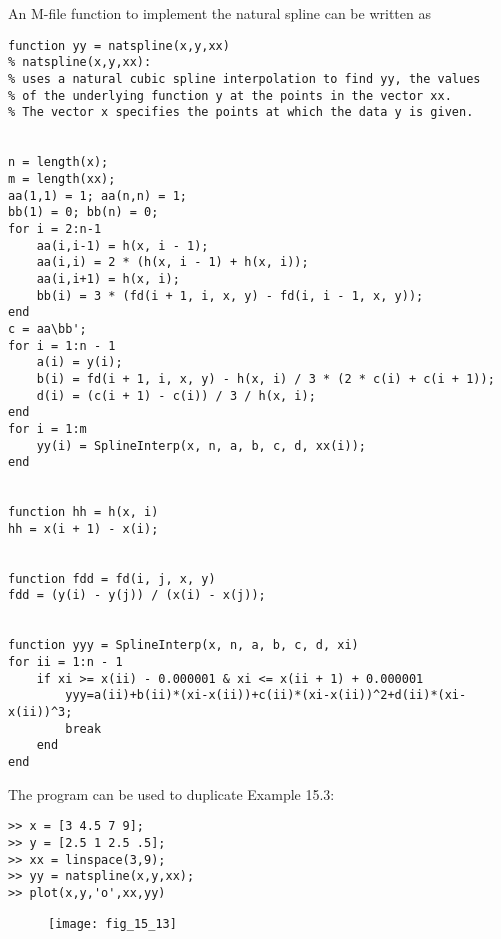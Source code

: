 \documentclass[../main.tex]{subfiles}
\begin{document}
\section{}
An M-file function to implement the natural spline can be written as
\begin{lstlisting}[numbers=none]
function yy = natspline(x,y,xx)
% natspline(x,y,xx):
% uses a natural cubic spline interpolation to find yy, the values
% of the underlying function y at the points in the vector xx.
% The vector x specifies the points at which the data y is given.


n = length(x);
m = length(xx);
aa(1,1) = 1; aa(n,n) = 1;
bb(1) = 0; bb(n) = 0;
for i = 2:n-1
	aa(i,i-1) = h(x, i - 1);
	aa(i,i) = 2 * (h(x, i - 1) + h(x, i));
	aa(i,i+1) = h(x, i);
	bb(i) = 3 * (fd(i + 1, i, x, y) - fd(i, i - 1, x, y));
end
c = aa\bb';
for i = 1:n - 1
	a(i) = y(i);
	b(i) = fd(i + 1, i, x, y) - h(x, i) / 3 * (2 * c(i) + c(i + 1));
	d(i) = (c(i + 1) - c(i)) / 3 / h(x, i);
end
for i = 1:m
	yy(i) = SplineInterp(x, n, a, b, c, d, xx(i));
end


function hh = h(x, i)
hh = x(i + 1) - x(i);


function fdd = fd(i, j, x, y)
fdd = (y(i) - y(j)) / (x(i) - x(j));


function yyy = SplineInterp(x, n, a, b, c, d, xi)
for ii = 1:n - 1
	if xi >= x(ii) - 0.000001 & xi <= x(ii + 1) + 0.000001
		yyy=a(ii)+b(ii)*(xi-x(ii))+c(ii)*(xi-x(ii))^2+d(ii)*(xi-x(ii))^3;
		break
	end
end 
\end{lstlisting}
	\bigbreak
The program can be used to duplicate Example 15.3:
	\bigbreak
\begin{lstlisting}[numbers=none]
>> x = [3 4.5 7 9];
>> y = [2.5 1 2.5 .5];
>> xx = linspace(3,9);
>> yy = natspline(x,y,xx);
>> plot(x,y,'o',xx,yy) 
\end{lstlisting}
	\begin{figure}[H]
		\texttt{[image: fig\_15\_13]}
		\label{fig:fig_15_13}
	\end{figure}
	\bigbreak
\end{document}
